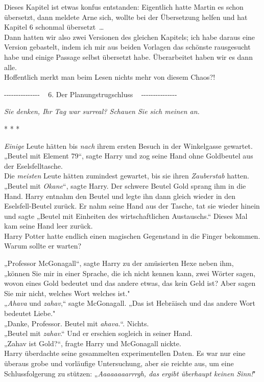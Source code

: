 

\hypertarget{der-planungstrugschluss}{%

Dieses Kapitel ist etwas konfus entstanden: Eigentlich hatte Martin es schon übersetzt, dann meldete Arne sich, wollte bei der Übersetzung helfen und hat Kapitel 6 schonmal übersetzt~…\\ Dann hatten wir also zwei Versionen des gleichen Kapitels; ich habe daraus eine Version gebastelt, indem ich mir aus beiden Vorlagen das schönste rausgesucht habe und einige Passage selbst übersetzt habe. Überarbeitet haben wir es dann alle.\\ Hoffentlich merkt man beim Lesen nichts mehr von diesem Chaos?!

-\/-\/-\/-\/-\/-\/-\/-\/-\/-\/-\/-\/-\/-\/- ~ 6. Der Planungstrugschluss ~ -\/-\/-\/-\/-\/-\/-\/-\/-\/-\/-\/-\/-\/-\/-

\emph{Sie denken, Ihr Tag war surreal? Schauen Sie sich meinen an.}

* * *

\emph{Einige} Leute hätten bis \emph{nach} ihrem ersten Besuch in der Winkelgasse gewartet.\\ „Beutel mit Element 79“, sagte Harry und zog seine Hand ohne Goldbeutel aus der Eselsfelltasche.\\ Die \emph{meisten} Leute hätten zumindest gewartet, bis sie ihren \emph{Zauberstab} hatten.\\ „Beutel mit \emph{Okane}“, sagte Harry. Der schwere Beutel Gold sprang ihm in die Hand. Harry entnahm den Beutel und legte ihn dann gleich wieder in den Eselsfell-Beutel zurück. Er nahm seine Hand aus der Tasche, tat sie wieder hinein und sagte „Beutel mit Einheiten des wirtschaftlichen Austauschs.“ Dieses Mal kam seine Hand leer zurück.\\ Harry Potter hatte endlich einen magischen Gegenstand in die Finger bekommen. Warum sollte er warten?

„Professor McGonagall“, sagte Harry zu der amüsierten Hexe neben ihm, „können Sie mir in einer Sprache, die ich nicht kennen kann, zwei Wörter sagen, wovon eines Gold bedeutet und das andere etwas, das kein Geld ist? Aber sagen Sie mir nicht, welches Wort welches ist."\\ „\emph{Ahava} und \emph{zahav},“ sagte McGonagall. „Das ist Hebräisch und das andere Wort bedeutet Liebe."\\ „Danke, Professor. Beutel mit \emph{ahava.}“. Nichts.\\ „Beutel mit \emph{zahav}.“ Und er erschien sogleich in seiner Hand.\\ „Zahav ist Gold?“, fragte Harry und McGonagall nickte.\\ Harry überdachte seine gesammelten experimentellen Daten. Es war nur eine überaus grobe und vorläufige Untersuchung, aber sie reichte aus, um eine Schlussfolgerung zu stützen: „\emph{Aaaaaaaarrrgh, das ergibt überhaupt keinen Sinn!}"

}
